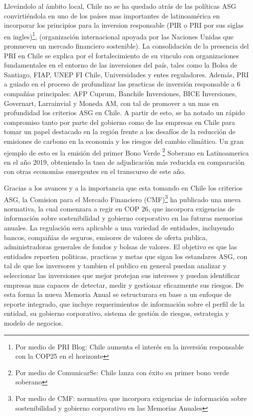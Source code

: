 \vspace{0.5cm}

Llevándolo al ámbito local, Chile no se ha quedado atrás de las políticas ASG convirtiéndola en uno de los países mas importantes de latinoamérica en incorporar los principios para la inversion responsable (PIR o PRI por sus siglas en ingles)\footnote{Por medio de PRI Blog: Chile aumenta el interés en la inversión responsable con la COP25 en el horizonte}, (organización internacional apoyada por las Naciones Unidas que promueven un mercado financiero sostenible). La consolidación de la presencia del PRI en Chile se explica por el fortalecimiento de su vinculo con organizaciones fundamentales en el entorno de las inversiones del país, tales como la Bolsa de Santiago, FIAP, UNEP FI Chile, Universidades y entes reguladores. Además, PRI a guiado en el proceso de profundizar las practicas de inversión responsable a 6 compañías principales: AFP Cuprum, Banchile Inversiones, BICE Inversiones, Governart, Larrainvial y Moneda AM, con tal de promover a un mas en profundidad los criterios ASG en Chile. A partir de esto, se ha notado un rápido compromiso tanto por parte del gobierno como de las empresas en Chile para tomar un papel destacado en la región frente a los desafíos de la reducción de emisiones de carbono en la economía y los riesgos del cambio climático. Un gran ejemplo de esto es la emisión del primer Bono Verde \footnote{Por medio de ComunicarSe: Chile lanza con éxito su primer bono verde soberano} Soberano en Latinoamerica en el año 2019, obteniendo la tasa de adjudicación más reducida en comparación con otras economías emergentes en el transcurso de este año. 

\vspace{0.5cm}

Gracias a los avances y a la importancia que esta tomando en Chile los criterios ASG, la Comision para el Mercado Financiero (CMF)\footnote{Por medio de CMF: normativa que incorpora exigencias de información sobre sostenibilidad y gobierno corporativo en las Memorias Anuales} ha publicado una nueva normativa, la cual comenzara a regir en COP 26, que incorpora exigencias de información sobre sostenibilidad y gobierno corporativo en las futuras memorias anuales. La regulación sera aplicable a una variedad de entidades, incluyendo bancos, compañías de seguros, emisores de valores de oferta publica, administradoras generales de fondos y bolsas de valores. El objetivo es que las entidades reporten politicas, practicas y metas que sigan los estandares ASG, con tal de que los inversores y tambien el publico en general puedan analizar y seleccionar las inversiones que mejor protejan sus intereses y puedan identificar empresas mas capaces de detectar, medir y gestionar eficazmente sus riesgos. De esta forma la nueva Memoria Anual se estructurara en base a un enfoque de reporte integrado, que incluye requerimientos de información sobre el perfil de la entidad, su gobierno corporativo, sistema de gestión de riesgos, estrategia y modelo de negocios.


